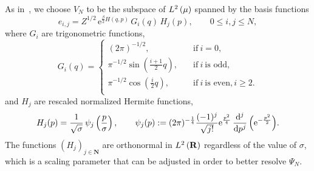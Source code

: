 \documentclass[11pt,a4paper]{article}
\newcommand{\e}{\mathrm{e}}
\newcommand{\nat}{\mathbf N}
\newcommand{\real}{\mathbf R}
\theoremstyle{plain}
\numberwithin{equation}{section}
\renewcommand{\leq}{\leqslant}
\renewcommand{\geq}{\geqslant}
\begin{document}
As in~\cite{roussel2018spectral},
we choose $V_N$ to be the subspace of $\lp{2}{\mu}$ spanned by the basis functions
\begin{equation}
  \label{eq:basis_functions}
  e_{i,j} = Z^{1/2} \, \e^{\frac{\beta}{2} H(q,p)}
  \, G_i(q) \, H_j(p), \qquad 0 \leq i,j \leq N,
\end{equation}
where $G_i$ are trigonometric functions,
\begin{equation}
  \label{eq:definition_trigonometric_functions}
  G_i(q) =
  \left\{ \begin{aligned}
    (2 \pi)^{-1/2}, \quad & \text{if}~i = 0, \\
    \pi^{-1/2} \sin\left(\frac{i + 1}{2}q\right), \quad & \text{if}~i~\text{is odd}, \\
    \pi^{-1/2} \cos\left(\frac{i}{2}q\right), \quad & \text{if}~i~\text{is even}, i \geq 2. \\
  \end{aligned} \right.
\end{equation}
and $H_j$ are rescaled normalized Hermite functions,
\begin{equation}
  \label{eq:definition_hermite_functions}
  H_j(p) = \frac{1}{\sqrt{\sigma}} \, \psi_j \left( \frac{p}{\sigma} \right),
  \qquad \psi_j (p) := (2 \pi)^{-\frac{1}{4}} \frac{(-1)^j}{\sqrt{j!}} \e^{\frac{p^2}{4}} \, \derivative*{j}{p^j} \, \Bigl( \e^{- \frac{p^2}{2}} \Bigr).
\end{equation}
The functions $(H_j)_{j\in \nat}$ are orthonormal in $\lp{2}{\real}$ regardless of the value of $\sigma$,
which is a scaling parameter that can be adjusted in order to better resolve $\Psi_N$.
\end{document}
